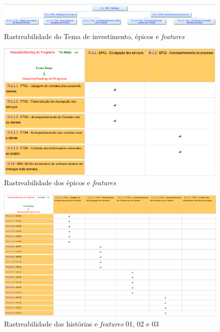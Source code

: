 \begin{figure}[!htb]
 \centering
 \includegraphics[scale= 0.5, angle=-90]{figuras/rastreabilidade_ferramenta.png}
 \caption{Rastreabilidade do Tema de investimento, épicos e \textit{features}}
 \label{fig:rastreabilidade}
\end{figure}

\begin{figure}[!htb]
 \centering
 \includegraphics[scale= 0.5]{figuras/epft.png}
 \caption{Rastreabilidade dos épicos e \textit{features}}
 \label{fig:epft}
\end{figure}

\begin{figure}[!htb]
 \centering
 \includegraphics[scale= 0.5]{figuras/ft01e02.png}
 \caption{Rastreabilidade das histórias e \textit{features} 01, 02 e 03}
 \label{fig:ft01}
\end{figure}

